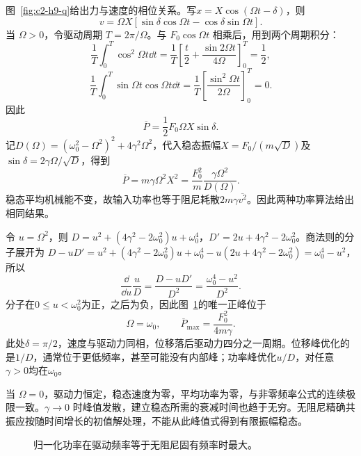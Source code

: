 \begin{solution}
图~\ref{fig:c2-h9-q}给出力与速度的相位关系。写$x=X\cos(\Omega t-\delta)$，则
\[v=\Omega X[\sin\delta\cos\Omega t-\cos\delta\sin\Omega t].\]
当 $\Omega>0$，令驱动周期 $T=2\pi/\Omega$。与 $F_0\cos\Omega t$ 相乘后，用到两个周期积分：
\[
\frac1T\int_0^T\cos^2\Omega t\dd t
=\frac1T\left[\frac t2+\frac{\sin2\Omega t}{4\Omega}\right]_0^T=\frac12,
\]
\[
\frac1T\int_0^T\sin\Omega t\cos\Omega t\dd t
=\frac1T\left[\frac{\sin^2\Omega t}{2\Omega}\right]_0^T=0.
\]
因此
\[\overline P=\frac12F_0\Omega X\sin\delta.\]
记$D(\Omega)=(\omega_0^2-\Omega^2)^2+4\gamma^2\Omega^2$，代入稳态振幅$X=F_0/(m\sqrt D)$及$\sin\delta=2\gamma\Omega/\sqrt D$，得到
\[\boxed{\overline P=m\gamma\Omega^2X^2
=\frac{F_0^2}{m}\frac{\gamma\Omega^2}{D(\Omega)}}.\]
稳态平均机械能不变，故输入功率也等于阻尼耗散$2m\gamma\overline{v^2}$。因此两种功率算法给出相同结果。

令 $u=\Omega^2$，则 $D=u^2+(4\gamma^2-2\omega_0^2)u+\omega_0^4$，$D'=2u+4\gamma^2-2\omega_0^2$。商法则的分子展开为 $D-uD'=u^2+(4\gamma^2-2\omega_0^2)u+\omega_0^4-u(2u+4\gamma^2-2\omega_0^2)=\omega_0^4-u^2$，所以
\[\frac{\dd}{\dd u}\frac uD=\frac{D-uD'}{D^2}
=\frac{\omega_0^4-u^2}{D^2}.\]
分子在$0\le u<\omega_0^2$为正，之后为负，因此图~\ref{fig:c2-h9-s}的唯一正峰位于
\[\boxed{\Omega=\omega_0,\qquad\overline P_{\max}=\frac{F_0^2}{4m\gamma}}.\]
此处$\delta=\pi/2$，速度与驱动力同相，位移落后驱动力四分之一周期。位移峰优化的是$1/D$，通常位于更低频率，甚至可能没有内部峰；功率峰优化$u/D$，对任意$\gamma>0$均在$\omega_0$。

当 $\Omega=0$，驱动力恒定，稳态速度为零，平均功率为零，与非零频率公式的连续极限一致。$\gamma\to0$ 时峰值发散，建立稳态所需的衰减时间也趋于无穷。无阻尼精确共振应按随时间增长的初值解处理，不能从此峰值式得到有限振幅稳态。

\begin{figure}[H]\centering
{}
\caption{归一化功率在驱动频率等于无阻尼固有频率时最大。}\label{fig:c2-h9-s}
\end{figure}
\end{solution}

